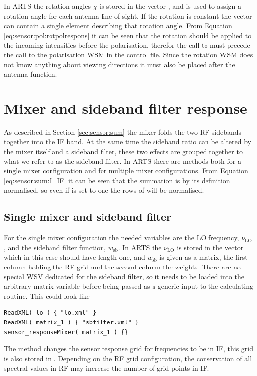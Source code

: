 In ARTS the rotation angles $\chi$ is stored in the vector
, and is used to assign a rotation angle for
each antenna line-of-sight. If the rotation is constant the
 vector can contain a single element describing
that rotation angle. From Equation \ref{eq:sensor:pol:rotpolrespons}
it can be seen that the rotation should be applied to the incoming
intensities before the polarisation, therefor the call to
 must precede the call to the
polarisation WSM in the control file. Since the rotation WSM does not
know anything about viewing directions it must also be placed after
the antenna function.


\section{Mixer and sideband filter response}
As described in Section \ref{sec:sensor:sum} the mixer folds the two
RF sidebands together into the IF band. At the same time the sideband
ratio can be altered by the mixer itself and a sideband filter, these
two effects are grouped together to what we refer to as the sideband
filter. In ARTS there are methods both for a single mixer
configuration and for multiple mixer configurations. From
Equation \ref{eq:sensor:sum:I_IF} it can be seen that the summation is
by its definition normalised, so even if  is
set to one the rows of  will be normalised.

\subsection{Single mixer and sideband filter}
For the single mixer configuration the needed variables are the LO
frequency, $\nu_\mathrm{LO}$, and the sideband filter function,
$w_\mathrm{sb}$. In ARTS the $\nu_\mathrm{LO}$ is stored in the vector
 which in this case should have length one, and
$w_\mathrm{sb}$ is given as a matrix, the first column holding the RF
grid and the second column the weights. There are no special WSV
dedicated for the sideband filter, so it needs to be loaded into the
arbitrary matrix variable  before being passed as
a generic input to the calculating routine. This could look like
\begin{lstlisting}
ReadXML( lo ) { "lo.xml" }
ReadXML( matrix_1 ) { "sbfilter.xml" }
sensor_responseMixer( matrix_1 ) {}
\end{lstlisting}
The method  changes the sensor
response grid for frequencies to be in IF, this grid is also stored in
. Depending on the RF grid configuration, the
conservation of all spectral values in RF may increase the number of
grid points in IF.

